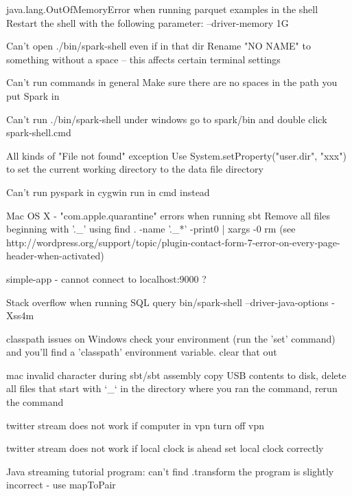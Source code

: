 java.lang.OutOfMemoryError when running parquet examples in the shell	Restart the shell with the following parameter: --driver-memory 1G

Can't open ./bin/spark-shell even if in that dir	Rename "NO NAME" to something without a space -- this affects certain terminal settings

Can't run commands in general	Make sure there are no spaces in the path you put Spark in

Can't run ./bin/spark-shell under windows	go to spark/bin and double click spark-shell.cmd

All kinds of "File not found" exception	Use System.setProperty("user.dir", "xxx") to set the current working directory to the data file directory

Can't run pyspark in cygwin	run in cmd instead

Mac OS X - "com.apple.quarantine" errors when running sbt	Remove all files beginning with '._' using find . -name '._*' -print0 | xargs -0 rm (see http://wordpress.org/support/topic/plugin-contact-form-7-error-on-every-page-header-when-activated)

simple-app - cannot connect to localhost:9000	?

Stack overflow when running SQL query	bin/spark-shell --driver-java-options -Xss4m

classpath issues on Windows	check your environment (run the 'set' command) and you'll find a 'classpath' environment variable. clear that out

mac invalid character during sbt/sbt assembly	copy USB contents to disk, delete all files that start with `_` in the directory where you ran the command, rerun the command

twitter stream does not work if computer in vpn	turn off vpn

twitter stream does not work if local clock is ahead	set local clock correctly

Java streaming tutorial program: can't find .transform	the program is slightly incorrect - use mapToPair